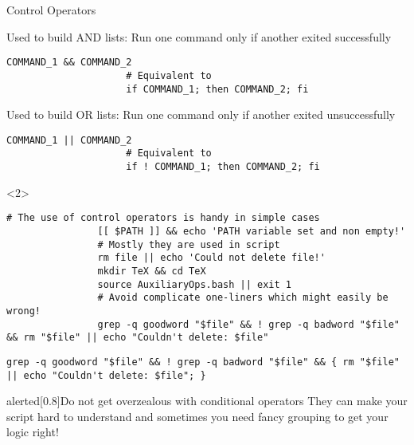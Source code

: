 \begin{frame}[fragile]{Control Operators}
    \vspace{-3mm}
    \begin{overlayarea}{\textwidth}{0.6\textheight}
        \begin{description}[<only@1>][\texttt{\&\&}]
            \setlength{\itemsep}{5mm}
            \item[\texttt{\&\&}]
                 Used to build AND lists: Run one command only if another exited successfully
                 \begin{lstlisting}[style=MyBash, numbers=none, aboveskip=2mm]
                     COMMAND_1 && COMMAND_2
                     # Equivalent to
                     if COMMAND_1; then COMMAND_2; fi
                 \end{lstlisting}
            \item[\texttt{||}]
                 Used to build OR lists: Run one command only if another exited unsuccessfully
                 \begin{lstlisting}[style=MyBash, numbers=none, aboveskip=2mm]
                     COMMAND_1 || COMMAND_2
                     # Equivalent to
                     if ! COMMAND_1; then COMMAND_2; fi
                 \end{lstlisting}
        \end{description}
        \begin{onlyenv}<2>
            \begin{lstlisting}[style=MyBash, numbers=none, belowskip=-5mm]
                # The use of control operators is handy in simple cases
                [[ $PATH ]] && echo 'PATH variable set and non empty!'
                # Mostly they are used in script
                rm file || echo 'Could not delete file!'
                mkdir TeX && cd TeX
                source AuxiliaryOps.bash || exit 1
                # Avoid complicate one-liners which might easily be wrong!
                grep -q goodword "$file" && ! grep -q badword "$file" && rm "$file" || echo "Couldn't delete: $file"
            \end{lstlisting}
            \centerline{\small{}}
            \begin{lstlisting}[style=MyBash, numbers=none, aboveskip=3mm]
                grep -q goodword "$file" && ! grep -q badword "$file" && { rm "$file" || echo "Couldn't delete: $file"; }
            \end{lstlisting}
        \end{onlyenv}
    \end{overlayarea}
    \begin{varblock}{alerted}[0.8\textwidth]{Do not get overzealous with conditional operators}
        They can make your script hard to understand and sometimes you need fancy grouping to get your logic right!
    \end{varblock}
\end{frame}
